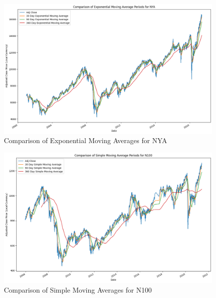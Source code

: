 \documentclass[a4paper, 11pt]{article}
\begin{document}
\begin{figure}[H]
    \begin{center}
        \includegraphics[width=1\textwidth]{Exponential Moving Averages for NYA.png}
        \caption{Comparison of Exponential Moving Averages for NYA}
    \end{center}
\end{figure}

\begin{figure}[H]
    \begin{center}
        \includegraphics[width=1\textwidth]{Simple Moving Averages for N100.png}
        \caption{Comparison of Simple  Moving Averages for N100}
    \end{center}
\end{figure}
\end{document}
